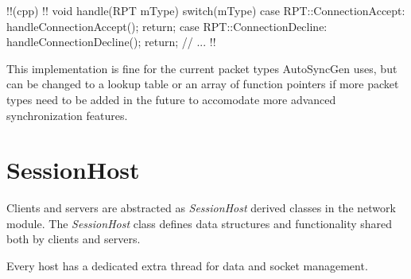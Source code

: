 \documentclass{report}
\begin{document}
                !!(cpp)
                !!{
    void handle(RPT mType)
    {
        switch(mType)
        {
            case RPT::ConnectionAccept:
                handleConnectionAccept();
                return;
            case RPT::ConnectionDecline:
                handleConnectionDecline();
                return;
            // ...
        }
    }
                !!}

                This implementation is fine for the current packet types AutoSyncGen uses, but can be changed to a lookup table or an array of function pointers if more packet types need to be added in the future to accomodate more advanced synchronization features.

        \section{SessionHost}

            Clients and servers are abstracted as \emph{SessionHost} derived classes in the network module.
            The \emph{SessionHost} class defines data structures and functionality shared both by clients and servers.

            Every host has a dedicated extra thread for data and socket management.
\end{document}
